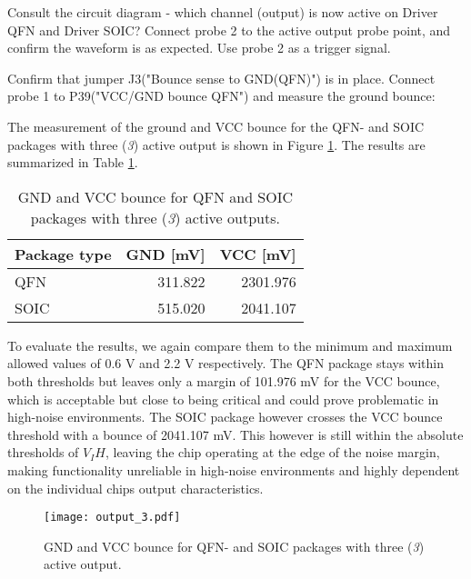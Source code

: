 \documentclass[../main.tex]{subfiles}
\begin{document}
\vspace{10pt}

Consult the circuit diagram - which channel (output) is now active on Driver QFN and Driver SOIC? Connect probe 2 to the active output probe point, and confirm the waveform is as expected. Use probe 2 as a trigger signal.

\vspace{10pt}

Confirm that jumper J3("Bounce sense to GND(QFN)") is in place. Connect probe 1 to P39("VCC/GND bounce QFN") and measure the ground bounce:

\solution

The measurement of the ground and VCC bounce for the QFN- and SOIC packages with three (\textit{3}) active output is shown in Figure \ref{fig:gnd_vcc_output_3}. The results are summarized in Table \ref{tab:output_3}.

\begin{table}[h]
    \centering
    \begin{tabular}{l | r r}
        \toprule[1pt]
        Package type    & GND [mV]  & VCC [mV]\\
        \midrule
        QFN             & 311.822   & 2301.976  \\
        SOIC            & 515.020   & 2041.107  \\
        \bottomrule[1pt]
    \end{tabular}
    \caption{GND and VCC bounce for QFN and SOIC packages with three (\textit{3}) active outputs.}
    \label{tab:output_3}
\end{table}

To evaluate the results, we again compare them to the minimum and maximum allowed values of 0.6 V and 2.2 V respectively. The QFN package stays within both thresholds but leaves only a margin of 101.976 mV for the VCC bounce, which is acceptable but close to being critical and could prove problematic in high-noise environments. The SOIC package however crosses the VCC bounce threshold with a bounce of 2041.107 mV. This however is still within the absolute thresholds of $V_IH$, leaving the chip operating at the edge of the noise margin, making functionality unreliable in high-noise environments and highly dependent on the individual chips output characteristics.

\newpage

\begin{figure}[h]
    \centering
    \texttt{[image: output\_3.pdf]}
    \caption{GND and VCC bounce for QFN- and SOIC packages with three (\textit{3}) active output.}
    \label{fig:gnd_vcc_output_3}
\end{figure}
\end{document}
